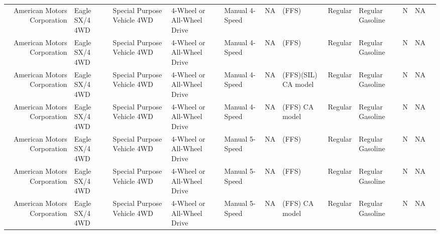 \documentclass[11pt]{article}
\begin{document}
\begin{tabular}{r|lllllllllll}
	 American Motors Corporation & Eagle SX/4 4WD              & Special Purpose Vehicle 4WD & 4-Wheel or All-Wheel Drive  & Manual 4-Speed              & NA                          & (FFS)                       & Regular                     & Regular Gasoline            & N                           & NA                         \\
	 American Motors Corporation & Eagle SX/4 4WD              & Special Purpose Vehicle 4WD & 4-Wheel or All-Wheel Drive  & Manual 4-Speed              & NA                          & (FFS)                       & Regular                     & Regular Gasoline            & N                           & NA                         \\
	 American Motors Corporation & Eagle SX/4 4WD              & Special Purpose Vehicle 4WD & 4-Wheel or All-Wheel Drive  & Manual 4-Speed              & NA                          & (FFS)(SIL) CA model         & Regular                     & Regular Gasoline            & N                           & NA                         \\
	 American Motors Corporation & Eagle SX/4 4WD              & Special Purpose Vehicle 4WD & 4-Wheel or All-Wheel Drive  & Manual 4-Speed              & NA                          & (FFS) CA model              & Regular                     & Regular Gasoline            & N                           & NA                         \\
	 American Motors Corporation & Eagle SX/4 4WD              & Special Purpose Vehicle 4WD & 4-Wheel or All-Wheel Drive  & Manual 5-Speed              & NA                          & (FFS)                       & Regular                     & Regular Gasoline            & N                           & NA                         \\
	 American Motors Corporation & Eagle SX/4 4WD              & Special Purpose Vehicle 4WD & 4-Wheel or All-Wheel Drive  & Manual 5-Speed              & NA                          & (FFS)                       & Regular                     & Regular Gasoline            & N                           & NA                         \\
	 American Motors Corporation & Eagle SX/4 4WD              & Special Purpose Vehicle 4WD & 4-Wheel or All-Wheel Drive  & Manual 5-Speed              & NA                          & (FFS) CA model              & Regular                     & Regular Gasoline            & N                           & NA                         \\

\end{tabular}
\end{document}
